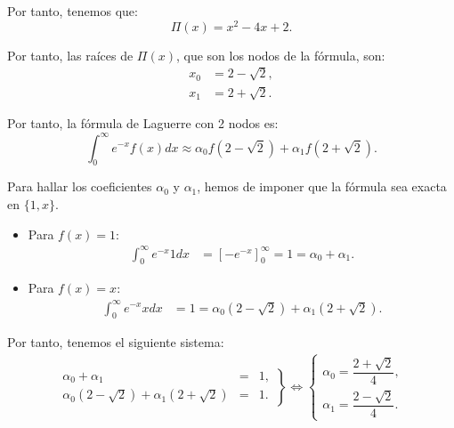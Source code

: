 \begin{ejercicio}
\begin{enumerate}
        Por tanto, tenemos que:
        \begin{equation*}
            \Pi(x) = x^2 - 4x + 2.
        \end{equation*}

        Por tanto, las raíces de $\Pi(x)$, que son los nodos de la fórmula, son:
        \begin{align*}
            x_0 &= 2 - \sqrt{2},\\
            x_1 &= 2 + \sqrt{2}.
        \end{align*}

        Por tanto, la fórmula de Laguerre con 2 nodos es:
        \begin{equation*}
            \int_{0}^{\infty} e^{-x} f(x) dx \approx \alpha_0 f(2 - \sqrt{2}) + \alpha_1 f(2 + \sqrt{2}).
        \end{equation*}

        Para hallar los coeficientes $\alpha_0$ y $\alpha_1$, hemos de imponer que la fórmula sea exacta en $\{1,x\}$.
        \begin{itemize}
            \item Para $f(x) = 1$:
            \begin{align*}
                \int_{0}^{\infty} e^{-x} 1 dx &= \left[-e^{-x}\right]_{0}^{\infty} = 1 = \alpha_0 + \alpha_1.
            \end{align*}
            \item Para $f(x) = x$:
            \begin{align*}
                \int_{0}^{\infty} e^{-x} x dx &= 1 = \alpha_0(2 - \sqrt{2}) + \alpha_1(2 + \sqrt{2}).
            \end{align*}
        \end{itemize}

        Por tanto, tenemos el siguiente sistema:
        \begin{align*}
            \left.
            \begin{array}{rcl}
                \alpha_0 + \alpha_1 &=& 1,\\
                \alpha_0(2 - \sqrt{2}) + \alpha_1(2 + \sqrt{2}) &=& 1.
            \end{array}
            \right\}
            \iff
            \left\{
            \begin{array}{rcl}
                \alpha_0 = \dfrac{2+ \sqrt{2}}{4},\\
                \alpha_1 = \dfrac{2- \sqrt{2}}{4}.
            \end{array}
            \right.
        \end{align*}


\end{enumerate}
\end{ejercicio}
